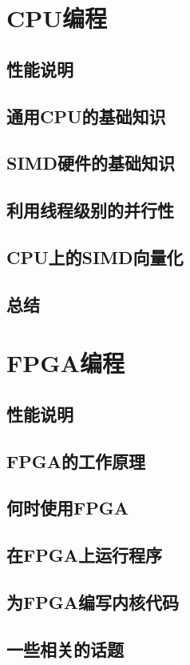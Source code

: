 \documentclass[11pt,a4paper,UTF8]{ctexart}
\begin{document}
	\section{CPU编程}
		\subsection{性能说明}
		\subsection{通用CPU的基础知识}
		\subsection{SIMD硬件的基础知识}
		\subsection{利用线程级别的并行性}
		\subsection{CPU上的SIMD向量化}
		\subsection{总结}
	\section{FPGA编程}
		\subsection{性能说明}
		\subsection{FPGA的工作原理}
		\subsection{何时使用FPGA}
		\subsection{在FPGA上运行程序}
		\subsection{为FPGA编写内核代码}
		\subsection{一些相关的话题}
\end{document}
